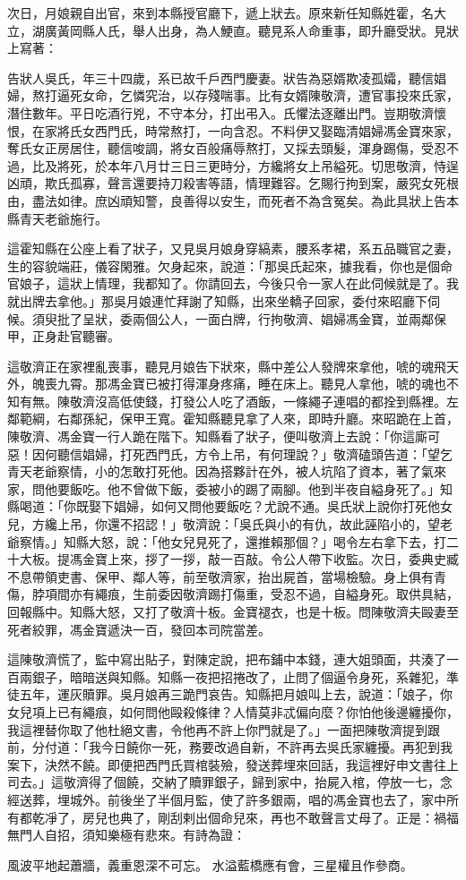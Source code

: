 次日，月娘親自出官，來到本縣授官廳下，遞上狀去。原來新任知縣姓霍，名大立，湖廣黃岡縣人氏，舉人出身，為人鯁直。聽見系人命重事，即升廳受狀。見狀上寫著：

告狀人吳氏，年三十四歲，系已故千戶西門慶妻。狀告為惡婿欺凌孤孀，聽信娼婦，熬打逼死女命，乞憐究治，以存殘喘事。比有女婿陳敬濟，遭官事投來氏家，潛住數年。平日吃酒行兇，不守本分，打出弔入。氏懼法逐離出門。豈期敬濟懷恨，在家將氏女西門氏，時常熬打，一向含忍。不料伊又娶臨清娼婦馮金寶來家，奪氏女正房居住，聽信唆調，將女百般痛辱熬打，又採去頭髮，渾身踢傷，受忍不過，比及將死，於本年八月廿三日三更時分，方纔將女上吊縊死。切思敬濟，恃逞凶頑，欺氏孤寡，聲言還要持刀殺害等語，情理難容。乞賜行拘到案，嚴究女死根由，盡法如律。庶凶頑知警，良善得以安生，而死者不為含冤矣。為此具狀上告本縣青天老爺施行。

這霍知縣在公座上看了狀子，又見吳月娘身穿縞素，腰系孝裙，系五品職官之妻，生的容貌端莊，儀容閑雅。欠身起來，說道：「那吳氏起來，據我看，你也是個命官娘子，這狀上情理，我都知了。你請回去，今後只令一家人在此伺候就是了。我就出牌去拿他。」那吳月娘連忙拜謝了知縣，出來坐轎子回家，委付來昭廳下伺候。須臾批了呈狀，委兩個公人，一面白牌，行拘敬濟、娼婦馮金寶，並兩鄰保甲，正身赴官聽審。

這敬濟正在家裡亂喪事，聽見月娘告下狀來，縣中差公人發牌來拿他，唬的魂飛天外，魄喪九霄。那馮金寶已被打得渾身疼痛，睡在床上。聽見人拿他，唬的魂也不知有無。陳敬濟沒高低使錢，打發公人吃了酒飯，一條繩子連唱的都拴到縣裡。左鄰範綱，右鄰孫紀，保甲王寬。霍知縣聽見拿了人來，即時升廳。來昭跪在上首，陳敬濟、馮金寶一行人跪在階下。知縣看了狀子，便叫敬濟上去說：「你這廝可惡！因何聽信娼婦，打死西門氏，方令上吊，有何理說？」敬濟磕頭告道：「望乞青天老爺察情，小的怎敢打死他。因為搭夥計在外，被人坑陷了資本，著了氣來家，問他要飯吃。他不曾做下飯，委被小的踢了兩腳。他到半夜自縊身死了。」知縣喝道：「你既娶下娼婦，如何又問他要飯吃？尤說不通。吳氏狀上說你打死他女兒，方纔上吊，你還不招認！」敬濟說：「吳氏與小的有仇，故此誣陷小的，望老爺察情。」知縣大怒，說：「他女兒見死了，還推賴那個？」喝令左右拿下去，打二十大板。提馮金寶上來，拶了一拶，敲一百敲。令公人帶下收監。次日，委典史臧不息帶領吏書、保甲、鄰人等，前至敬濟家，抬出屍首，當場檢驗。身上俱有青傷，脖項間亦有繩痕，生前委因敬濟踢打傷重，受忍不過，自縊身死。取供具結，回報縣中。知縣大怒，又打了敬濟十板。金寶褪衣，也是十板。問陳敬濟夫毆妻至死者絞罪，馮金寶遞決一百，發回本司院當差。

這陳敬濟慌了，監中寫出貼子，對陳定說，把布鋪中本錢，連大姐頭面，共湊了一百兩銀子，暗暗送與知縣。知縣一夜把招捲改了，止問了個逼令身死，系雜犯，準徒五年，運灰贖罪。吳月娘再三跪門哀告。知縣把月娘叫上去，說道：「娘子，你女兒項上已有繩痕，如何問他毆殺條律？人情莫非忒偏向麼？你怕他後邊纏擾你，我這裡替你取了他杜絕文書，令他再不許上你門就是了。」一面把陳敬濟提到跟前，分付道：「我今日饒你一死，務要改過自新，不許再去吳氏家纏擾。再犯到我案下，決然不饒。即便把西門氏買棺裝殮，發送葬埋來回話，我這裡好申文書往上司去。」這敬濟得了個饒，交納了贖罪銀子，歸到家中，抬屍入棺，停放一七，念經送葬，埋城外。前後坐了半個月監，使了許多銀兩，唱的馮金寶也去了，家中所有都乾凈了，房兒也典了，剛刮剌出個命兒來，再也不敢聲言丈母了。正是：禍福無門人自招，須知樂極有悲來。有詩為證：

風波平地起蕭牆，義重恩深不可忘。
水溢藍橋應有會，三星權且作參商。


